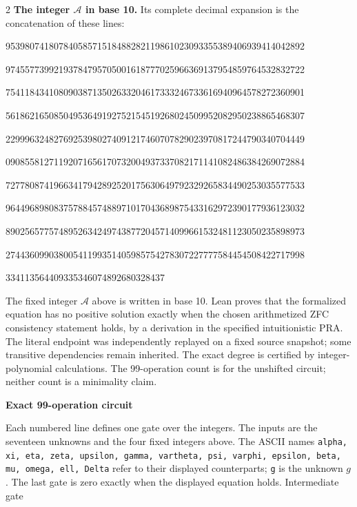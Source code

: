 \documentclass[10pt]{article}
\begin{document}
\begin{multicols}{2}
\textbf{The integer $\mathcal A$ in base 10.}
Its complete decimal expansion is the concatenation of these lines:\par
\begingroup\fontsize{7.7}{8.2}\selectfont{}\par
95398074180784058571518488282119861023093355389406939414042892\par
97455773992193784795705001618777025966369137954859764532832722\par
75411843410809038713502633204617333246733616940964578272360901\par
56186216508504953649192752154519268024509952082950238865468307\par
22999632482769253980274091217460707829023970817244790340704449\par
09085581271192071656170732004937337082171141082486384269072884\par
72778087419663417942892520175630649792329265834490253035577533\par
96449689808375788457488971017043689875433162972390177936123032\par
89025657757489526342497438772045714099661532481123050235898973\par
27443609903800541199351405985754278307227777584454508422717998\par
334113564409335346074892680328437\par
\endgroup
\normalfont\fontsize{7.7}{8.2}\selectfont
The fixed integer $\mathcal A$ above is written in base 10. Lean proves that
the formalized equation has no positive solution exactly when the chosen
arithmetized ZFC consistency statement holds, by a derivation in the specified
intuitionistic PRA. The literal endpoint was independently replayed on a fixed
source snapshot; some transitive dependencies remain inherited. The exact
degree is certified by integer-polynomial calculations. The 99-operation count
is for the unshifted circuit; neither count is a minimality claim.
\end{multicols}
\clearpage
\begin{center}{\large\bfseries Exact 99-operation circuit}\end{center}
Each numbered line defines one gate over the integers. The inputs are the
seventeen unknowns and the four fixed integers above. The ASCII names
\texttt{alpha, xi, eta, zeta, upsilon, gamma, vartheta, psi, varphi, epsilon, beta, mu, omega, ell, Delta}
refer to their displayed counterparts; \texttt{g} is the unknown $g$. The last
gate is zero exactly when the displayed equation holds. Intermediate gate
\end{document}
